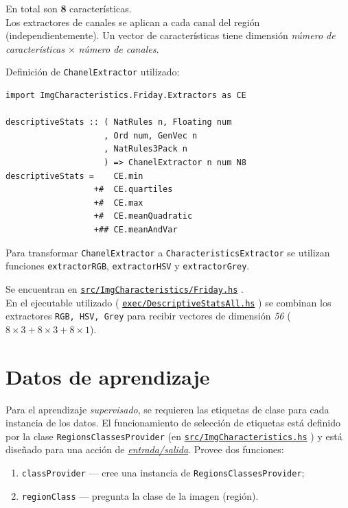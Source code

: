 \documentclass{article}
\newcommand\refcode[2]{ \href{#1}{\texttt{#2}} }
\begin{document}
En total son \textbf{8} características. \\

\noindent Los extractores de canales se aplican a cada canal del región (independientemente). Un vector de características tiene dimensión \emph{número de características} $\times$ \emph{número de canales}.

\medskip

\noindent Definición de \verb|ChanelExtractor| utilizado:
\begin{lstlisting}
import ImgCharacteristics.Friday.Extractors as CE

descriptiveStats :: ( NatRules n, Floating num
                    , Ord num, GenVec n
                    , NatRules3Pack n
                    ) => ChanelExtractor n num N8
descriptiveStats =    CE.min
                  +#  CE.quartiles
                  +#  CE.max
                  +#  CE.meanQuadratic
                  +## CE.meanAndVar
\end{lstlisting}

\medskip

Para transformar \verb|ChanelExtractor| a \verb|CharacteristicsExtractor| se utilizan funciones \verb|extractorRGB|, \verb|extractorHSV| y \verb|extractorGrey|.

Se encuentran en \refcode{\Friday}{src/ImgCharacteristics/Friday.hs}.\\

En el ejecutable utilizado (\refcode{\ExecAll}{exec/DescriptiveStatsAll.hs}) se combinan los extractores \verb|RGB, HSV, Grey| para recibir vectores de dimensión \emph{56} ($8\times3 + 8\times3 + 8\times1$).

\section{Datos de aprendizaje}

Para el aprendizaje \emph{supervisado}, se requieren las etiquetas de clase para cada instancia de los datos. El funcionamiento de selección de etiquetas está definido por la clase \verb|RegionsClassesProvider| (en \refcode{\ImgCharacteristics}{src/ImgCharacteristics.hs}) y está diseñado para una acción de \href{https://www.haskell.org/tutorial/io.html}{\emph{entrada/salida}}. Provee dos funciones:
\begin{enumerate}
    \item \verb|classProvider| --- cree una instancia de \verb|RegionsClassesProvider|;
    \item \verb|regionClass| --- pregunta la clase de la imagen (región).
\end{enumerate}
\end{document}
